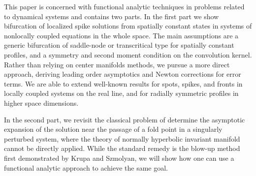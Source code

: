 
This paper is concerned with functional analytic techniques in problems related to dynamical systems and contains two parts. In the first part we show bifurcation of localized spike solutions from spatially constant states in systems of nonlocally coupled equations in the whole space. The main assumptions are a generic bifurcation of saddle-node or transcritical type for spatially constant profiles, and a symmetry and second moment condition on the
convolution kernel. Rather than relying on center manifolds methods, we pursue a more direct approach, deriving leading order asymptotics and Newton corrections for error terms. We are able to extend well-known results for spots, spikes, and fronts in locally coupled systems on the real line, and for radially symmetric profiles in higher space dimensions. 

In the second part, we revisit the classical problem of determine the asymptotic expansion of the solution near the passage of a fold point in a singularly perturbed system, where the theory of normally hyperbolic invariant manifold cannot be directly applied. While the standard remedy is the blow-up method first demonstrated by Krupa and Szmolyan, we will show how one can use a functional analytic approach to achieve the same goal.